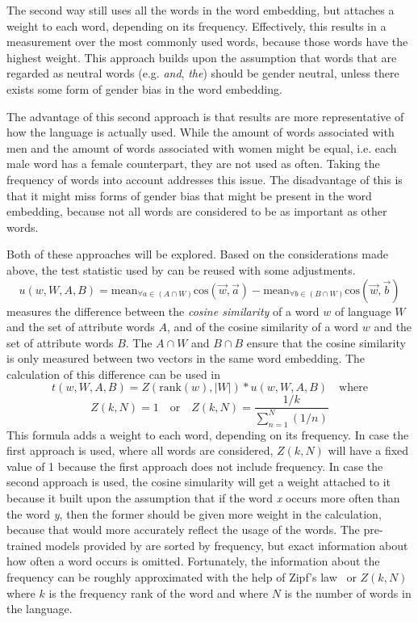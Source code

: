 The second way still uses all the words in the word embedding, but attaches a weight to
each word, depending on its frequency. Effectively, this results in a measurement over
the most commonly used words, because those words have the highest weight.
This approach builds upon the assumption that words that are regarded as neutral words
(e.g. \textit{and}, \textit{the}) should be gender neutral, unless there exists some form
of gender bias in the word embedding.

The advantage of this second approach is that results are more representative of how
the language is actually used. While the amount of words associated with men and the
amount of words associated with women might be equal, i.e. each male word has a female
counterpart, they are not used as often.
Taking the frequency of words into account addresses this issue. 
The disadvantage of this is that
it might miss forms of gender bias that might be present in the word embedding, because
not all words are considered to be as important as other words.

Both of these approaches will be explored. Based on the considerations made above, the
test statistic used by
\textcite{caliskan_2017_semantics_language_corpora} can be reused with some adjustments. 
$$
u(w,W,A,B) = \text{mean}_{\forall a \in (A \cap W)}\text{cos}(\overrightarrow{w}, \overrightarrow{a}) - \text{mean}_{\forall b \in (B \cap W)}\text{cos}(\overrightarrow{w}, \overrightarrow{b})
$$
measures the difference between the \textit{cosine similarity} of a word $w$ of language $W$ and the set of attribute words $A$, and of the cosine similarity of a word $w$ and the
set of attribute words $B$. The $A \cap W$ and $B \cap B$ ensure that the cosine
similarity is only measured between two vectors in the same word embedding. The
calculation of this difference can be used in
$$
t(w,W,A,B) = Z(\text{rank}(w), |W|) * u(w,W,A,B)\quad\text{where}
$$
$$
Z(k, N) = 1 \quad\text{or}\quad Z(k, N) = \frac{1/k}{\displaystyle\sum_{n=1}^{N}(1/n)}
$$
This formula adds a weight to each word, depending on its frequency.
In case the first approach is used, where all words are considered, $Z(k,N)$ will have a
fixed value of 1 because the first approach does not include frequency.
In case the second approach is used, the cosine simularity will get a weight attached
to it because it built upon the assumption that
if the word \textit{x} occurs more often than the word \textit{y}, then the former should be given more weight in the calculation, because that would more accurately reflect the usage of the words. The pre-trained models provided by \textcite{grave2018learning} are sorted by frequency, but exact information about how often a word occurs is omitted.
Fortunately, the information about the frequency can be roughly approximated with the
help of Zipf's law~\parencite{Zipf-1935} or $Z(k,N)$ where $k$ is the frequency rank of the
word and where $N$ is the number of words in the language.

